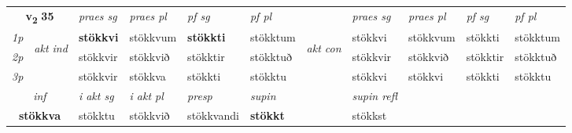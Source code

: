 \noindent
\begin{tabular}{lllllllllll} \toprule
\multicolumn{2}{c}{\textbf{v{\textsubscript{2}}} \Large{\textbf{35}}}  &  \textit{praes sg}  & \textit{praes pl}  &\textit{ pf sg} & \textit{pf pl} &  &  \textit{praes sg}  & \textit{praes pl}  & \textit{pf sg} & \textit{pf pl } \\*
	\cmidrule{3-6} \cmidrule{8-11}
 {\textit{1p}} & \multirow{3}{*}{\begin{turn}{90}\textit{akt ind}\end{turn}} & \textbf{stökkvi} & stökkvum & \textbf{stökkti} & stökktum & \multirow{3}{*}{\begin{turn}{90}\textit{akt con}\end{turn}} &stökkvi & stökkvum & stökkti & stökktum\\*
 {\textit{2p}} &  &  stökkvir  & stökkvið & stökktir & stökktuð & & stökkvir & stökkvið & stökktir & stökktuð \\*
{\textit{3p}} &  & stökkvir & stökkva & stökkti & stökktu & & stökkvi & stökkvi& stökkti & stökktu \\*
\cmidrule{3-6} \cmidrule{8-11}

   \multicolumn{2}{c}{\textit{inf}}  & \textit{i akt sg} & \textit{i akt pl}   & \textit{presp} & \textit{supin} && \textit{supin refl}  \\*
  \multicolumn{2}{c}{\textbf{stökkva}} & stökktu  & stökkvið   & stökkvandi &  \textbf{stökkt} && stökkst  \\*
\end{tabular}

